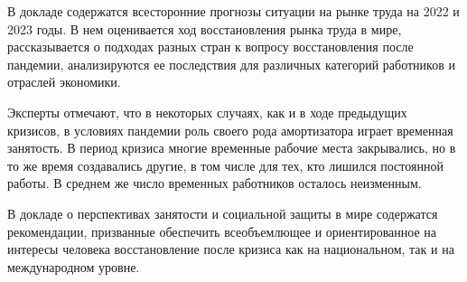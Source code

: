 В докладе содержатся всесторонние прогнозы ситуации на рынке труда на 2022 и 2023 годы. В нем оценивается ход восстановления рынка труда в мире, рассказывается о подходах разных стран к вопросу восстановления после пандемии, анализируются ее последствия для различных категорий работников и отраслей экономики.

Эксперты отмечают, что в некоторых случаях, как и в ходе предыдущих кризисов, в условиях пандемии роль своего рода амортизатора играет временная занятость. В период кризиса многие временные рабочие места закрывались, но в то же время создавались другие, в том числе для тех, кто лишился постоянной работы. В среднем же число временных работников осталось неизменным.

В докладе о перспективах занятости и социальной защиты в мире содержатся рекомендации, призванные обеспечить всеобъемлющее и ориентированное на интересы человека восстановление после кризиса как на национальном, так и на международном уровне.